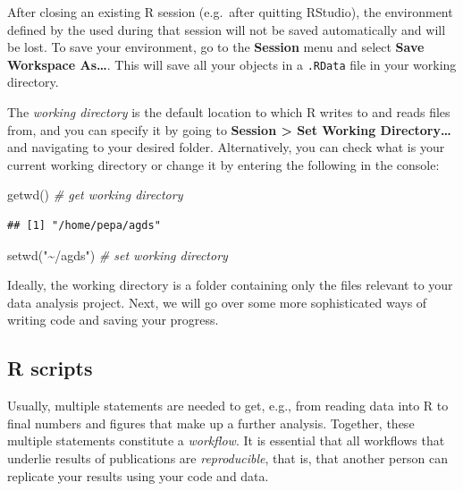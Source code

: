\documentclass[
]{book}
\newenvironment{Shaded}{\begin{snugshade}}{\end{snugshade}}
\newcommand{\CommentTok}[1]{\textcolor[rgb]{0.56,0.35,0.01}{\textit{#1}}}
\newcommand{\FunctionTok}[1]{\textcolor[rgb]{0.00,0.00,0.00}{#1}}
\newcommand{\NormalTok}[1]{#1}
\newcommand{\StringTok}[1]{\textcolor[rgb]{0.31,0.60,0.02}{#1}}
\begin{document}
After closing an existing R session (e.g.~after quitting RStudio), the environment defined by the used during that session will not be saved automatically and will be lost. To save your environment, go to the \textbf{Session} menu and select \textbf{Save Workspace As\ldots{}}. This will save all your objects in a \texttt{.RData} file in your working directory.

The \emph{working directory} is the default location to which R writes to and reads files from, and you can specify it by going to \textbf{Session \textgreater{} Set Working Directory\ldots{}} and navigating to your desired folder. Alternatively, you can check what is your current working directory or change it by entering the following in the console:

\begin{Shaded}
\begin{Highlighting}[]
\FunctionTok{getwd}\NormalTok{() }\CommentTok{\# get working directory}
\end{Highlighting}
\end{Shaded}

\begin{verbatim}
## [1] "/home/pepa/agds"
\end{verbatim}

\begin{Shaded}
\begin{Highlighting}[]
\FunctionTok{setwd}\NormalTok{(}\StringTok{"\textasciitilde{}/agds"}\NormalTok{) }\CommentTok{\# set working directory}
\end{Highlighting}
\end{Shaded}

Ideally, the working directory is a folder containing only the files relevant to your data analysis project. Next, we will go over some more sophisticated ways of writing code and saving your progress.

\hypertarget{r-scripts}{%
\subsection{R scripts}\label{r-scripts}}

Usually, multiple statements are needed to get, e.g., from reading data into R to final numbers and figures that make up a further analysis. Together, these multiple statements constitute a \emph{workflow}. It is essential that all workflows that underlie results of publications are \emph{reproducible}, that is, that another person can replicate your results using your code and data.
\end{document}
